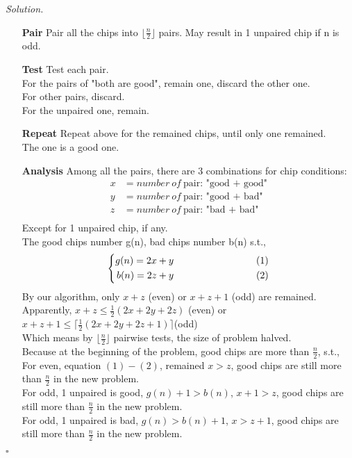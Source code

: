\documentclass[11pt]{article}
\theoremstyle{definition}
\newenvironment{solution}{\noindent\emph{Solution.}}{\hfill$\square$}
\newcommand\tab[1][1cm]{\hspace*{#1}}
\begin{document}
\begin{solution}
\begin{enumerate}
    \item[\textbf{Pair}]
    Pair all the chips into $ \lfloor \frac{n}{2} \rfloor $ pairs. May result in 1 unpaired chip if n is odd.

    \item[\textbf{Test}]
Test each pair.\\
    For the pairs of "both are good", remain one, discard the other one.\\
    For other pairs, discard.\\
    For the unpaired one, remain.
    


    \item[\textbf{Repeat}]
    Repeat above for the remained chips, until only one remained.\\
    The one is a good one.


\item[\textbf{Analysis}]
Among all the pairs, there are 3 combinations for chip conditions:
\begin{align*}
x &= number \ of \ \mbox{pair: "good + good"}\\
y &= number \ of \ \mbox{pair: "good + bad"} \\
z &= number \ of \ \mbox{pair: "bad + bad" }\\
\end{align*}
Except for 1 unpaired chip, if any.\\
The good chips number g(n), bad chips number b(n) s.t.,
$$
\left \{
\begin{aligned}
g(n) = 2x + y \tab\tab\tab (1)\\
b(n) = 2z + y \tab\tab\tab (2)
\end{aligned}
\right.
$$
By our algorithm, only $x + z$ 
(even) or $x + z +1$
(odd) are remained.\\
Apparently, $x +z \leq \frac{1}{2} (2x + 2y + 2z)$ (even)
or $x +z + 1 \leq \lceil\frac{1}{2} (2x + 2y + 2z + 1)\rceil$(odd) \\
Which means by $ \lfloor \frac{n}{2} \rfloor $ pairwise tests, the size of problem halved.\\
Because at the beginning of the problem, good chips are more than $\frac{n}{2}$, s.t.,\\
For even, equation $(1) - (2)$, remained $x > z$, good chips are still more than $\frac{n}{2}$ in the new problem.\\
For odd, 1 unpaired is good, $g(n)+1>b(n)$, $x+1 > z$, good chips are still more than $\frac{n}{2}$ in the new problem.\\
For odd, 1 unpaired is bad, $g(n)>b(n)+1$, $x> z +1$, good chips are still more than $\frac{n}{2}$ in the new problem.

\end{enumerate}

\end{solution}
\end{document}
